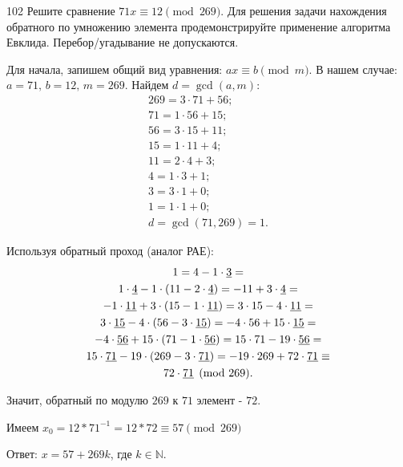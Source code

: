 \begin{task}{102}
Решите сравнение $71x\equiv 12\pmod{269}$. Для решения задачи нахождения обратного по умножению элемента продемонстрируйте применение алгоритма Евклида. Перебор/угадывание не допускаются.
\end{task}

\begin{solution}
Для начала, запишем общий вид уравнения: $ax\equiv b\pmod{m}$. В нашем случае: $a = 71 ,\, b = 12 ,\, m = 269$. Найдем $d = \operatorname{gcd}(a, m)$:
\begin{align*}
    269 = 3\cdot71 + 56;\\
    71 = 1\cdot56 + 15;\\
    56 = 3\cdot15 + 11;\\
    15 = 1\cdot11 + 4;\\
    11 = 2\cdot4 + 3;\\
    4 = 1\cdot3 + 1;\\
    3 = 3\cdot1 + 0;\\
    1 = 1\cdot1 + 0;\\
    d = \operatorname{gcd}(71, 269) = 1.
\end{align*}
\par
Используя обратный проход (аналог РАЕ):
\begin{gather*}
1 = 4 - 1\cdot\uline{3} = \\
1\cdot\uline{4} - 1\cdot(11 - 2\cdot\uline{4}) = -11 + 3\cdot\uline{4} = \\
-1\cdot\uline{11} + 3\cdot(15 - 1\cdot\uline{11}) = 3\cdot15 - 4\cdot\uline{11} = \\
3\cdot\uline{15} - 4\cdot(56 - 3\cdot\uline{15}) = -4\cdot56 + 15\cdot\uline{15} = \\
-4\cdot\uline{56} + 15\cdot(71 - 1\cdot\uline{56}) = 15\cdot71 - 19\cdot\uline{56} = \\
15\cdot\uline{71} - 19\cdot(269 - 3\cdot\uline{71}) = -19\cdot269 + 72\cdot\uline{71} \equiv \\
72\cdot\uline{71} \pmod{269}.
\end{gather*}\par
Значит, обратный по модулю $269$ к $71$ элемент - $72$.\par
Имеем $x_0 = 12*71^{-1}=12*72\equiv 57 \pmod{269}$\par
Ответ: $x = 57 + 269k$, где $k \in \mathbb{N}$.
\end{solution}